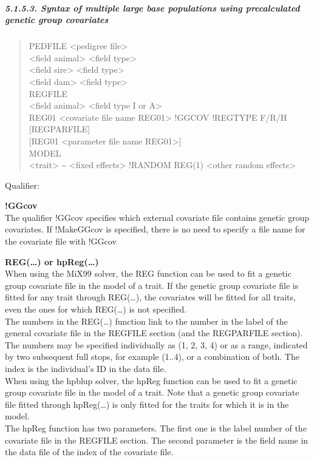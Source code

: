 \subparagraph{5.1.5.3. Syntax of multiple large base populations using
precalculated genetic group covariates}\label{Gene16}

\begin{quote}
PEDFILE \textless pedigree file\textgreater{}\\
\textless field animal\textgreater{} \textless field
type\textgreater{}\\
\textless field sire\textgreater{} \textless field type\textgreater{}\\
\textless field dam\textgreater{} \textless field type\textgreater{}\\
REGFILE\\
\textless field animal\textgreater{} \textless field type I or
A\textgreater{}\\
REG01 \textless covariate file name REG01\textgreater{} !GGCOV !REGTYPE
F/R/H\\
{[}REGPARFILE{]}\\
{[}REG01 \textless parameter file name REG01\textgreater{]}\\
MODEL\\
\textless trait\textgreater{} \textasciitilde{} \textless fixed
effects\textgreater{} !RANDOM REG(1) \textless other random
effects\textgreater{}
\end{quote}

Qualifier:

\textbf{!GGcov}\\
The qualifier !GGcov specifies which external covariate file contains
genetic group covariates. If !MakeGGcov is specified, there is no need
to specify a file name for the covariate file with !GGcov

\textbf{REG(\ldots) or hpReg(\ldots)}\\
When using the MiX99 solver, the REG function can be used to fit a
genetic group covariate file in the model of a trait. If the genetic
group covariate file is fitted for any trait through REG(\ldots), the
covariates will be fitted for all traits, even the ones for which
REG(\ldots) is not specified.\\
The numbers in the REG(\ldots) function link to the number in the label
of the general covariate file in the REGFILE section (and the REGPARFILE
section). The numbers may be specified individually as (1, 2, 3, 4) or
as a range, indicated by two subsequent full stops, for example (1..4),
or a combination of both. The index is the individual's ID in the data
file.\\
When using the hpblup solver, the hpReg function can be used to fit a
genetic group covariate file in the model of a trait. Note that a
genetic group covariate file fitted through hpReg(\ldots) is only fitted
for the traits for which it is in the model.\\
The hpReg function has two parameters. The first one is the label number
of the covariate file in the REGFILE section. The second parameter is
the field name in the data file of the index of the covariate file.

